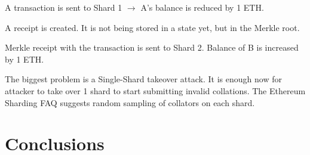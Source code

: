 A transaction is sent to Shard 1 $\rightarrow$ A's balance is reduced by 1 ETH.

A receipt is created. It is not being stored in a state yet, but in the Merkle
root.

Merkle receipt with the transaction is sent to Shard 2. Balance of B is
increased by 1 ETH.

The biggest problem is a Single-Shard takeover attack. It is enough now for
attacker to take over 1 shard to start submitting invalid collations. The
Ethereum Sharding FAQ suggests random sampling of collators on each shard.

\section{Conclusions}
